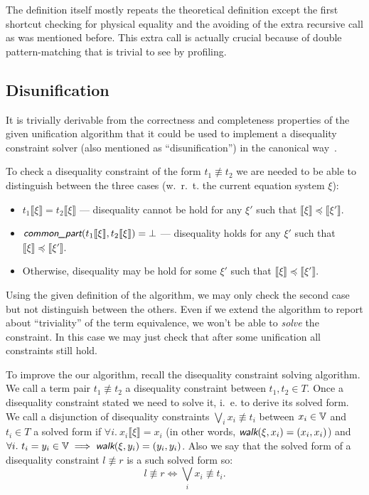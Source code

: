 The \unify definition itself mostly repeats the theoretical definition except the first shortcut checking for physical equality and the avoiding of the extra recursive call as was mentioned before. This extra call is actually crucial because of double pattern-matching that is trivial to see by profiling.


\subsection{Disunification}

It is trivially derivable from the correctness and completeness properties of the given unification algorithm that it could be used to implement a disequality constraint solver (also mentioned as ``disunification'') in the canonical way~\cite{comon1991disuni,friedman2009relational}.

To check a disequality constraint of the form $t_1 \not\equiv t_2$ we are needed to be able to distinguish between the three cases (w.~r.~t. the current equation system $\xi$):
\begin{itemize}
    \item $t_1 \llbracket \xi \rrbracket = t_2 \llbracket \xi \rrbracket$ --- disequality cannot be hold for any $\xi'$ such that $\llbracket \xi \rrbracket \preceq \llbracket \xi' \rrbracket$.
    \item $\commonpart(t_1 \llbracket \xi \rrbracket, t_2 \llbracket \xi \rrbracket) = \bot$ --- disequality holds for any $\xi'$ such that $\llbracket \xi \rrbracket \preceq \llbracket \xi' \rrbracket$.
    \item Otherwise, disequality may be hold for some $\xi'$ such that $\llbracket \xi \rrbracket \preceq \llbracket \xi' \rrbracket$.
\end{itemize}

Using the given definition of the algorithm, we may only check the second case but not distinguish between the others. Even if we extend the algorithm to report about ``triviality'' of the term equivalence, we won't be able to \textit{solve} the constraint. In this case we may just check that after some unification all constraints still hold.

To improve the our algorithm, recall the disequality constraint solving algorithm. We call a term pair $t_1 \not\equiv t_2$ a disequality constraint between $t_1, t_2 \in T$. Once a disequality constraint stated we need to solve it, i.~e. to derive its solved form. We call a disjunction of disequality constraints $\bigvee_{i} x_i \not\equiv t_i$ between $x_i \in \mathbb{V}$ and $t_i \in T$ a solved form if $\forall i. ~ x_i \llbracket \xi \rrbracket = x_i$ (in other words, $\walk(\xi, x_i) = (x_i, x_i)$) and $\forall i. ~ t_i = y_i \in \V \implies \walk(\xi, y_i) = (y_i, y_i)$. Also we say that the solved form of a disequality constraint $l \not\equiv r$ is a such solved form so:
\[l \not\equiv r \Leftrightarrow \bigvee_{i} x_i \not\equiv t_i.\]

